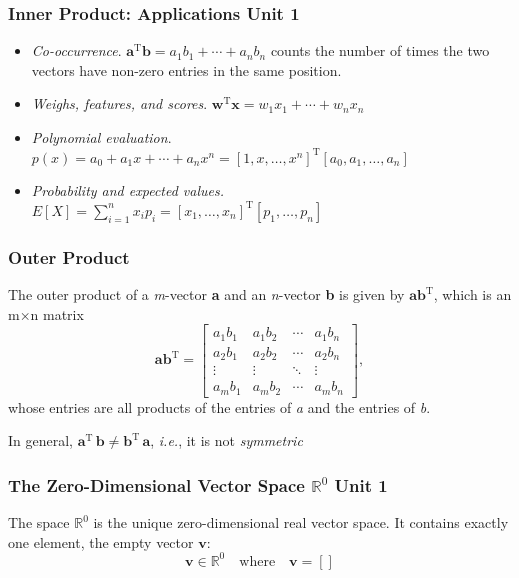 \documentclass[12pt]{beamer}
\newcommand{\FrameTitle}[2]{\frametitle{#1 \hfill \small\textnormal{\textcolor{midgray}{#2}}}}
\newcommand{\vsp}{\vspace*{1em}}
\newcommand{\smallvspace}{\vspace*{0.5em}}
\newcommand{\Vector}[1]{\textbf{#1}}
\begin{document}
\begin{frame}\FrameTitle{Inner Product: Applications}{Unit 1}
    \begin{itemize}
        \item \emph{Co-occurrence}. $\Vector{a}^{\textrm{T}} \Vector{b} = a_1b_1 + \cdots + a_nb_n$ counts the number of times the two vectors have non-zero entries in the same position.
        \smallvspace
        \item \emph{Weighs, features, and scores}. $\Vector{w}^{\textrm{T}} \Vector{x} = w_1x_1 + \cdots + w_nx_n$
        \smallvspace
        \item \emph{Polynomial evaluation}. $p(x) = a_0 + a_1x + \cdots + a_nx^n = [1, x, \ldots, x^n]^{\textrm{T}}[a_0, a_1, \ldots, a_n]$
        \smallvspace
        \item \emph{Probability and expected values.} $E[X] = \sum_{i=1}^{n} x_i p_i = [x_1, \ldots, x_n]^{\textrm{T}}[p_1, \ldots, p_n]$
    \end{itemize}
\end{frame}


\begin{frame}\FrameTitle{Outer Product}{}
    \begin{definition}
        The outer product of a \emph{m}-vector \Vector{a} and an \emph{n}-vector \Vector{b} is
        given by $\Vector{a}\Vector{b}^{\textrm{T}}$, which is an m×n matrix
        \[
            \Vector{a}\Vector{b}^{\textrm{T}} = \begin{bmatrix}
                a_1b_1 & a_1b_2 & \cdots & a_1b_n \\
                a_2b_1 & a_2b_2 & \cdots & a_2b_n \\
                \vdots & \vdots & \ddots & \vdots \\
                a_mb_1 & a_mb_2 & \cdots & a_mb_n
            \end{bmatrix},
        \]
        whose entries are all products of the entries of \emph{a} and the entries of \emph{b}.
    \end{definition}

    \vsp
    In general, $\Vector{a}^{\textrm{T}}\,\Vector{b} \neq \Vector{b}^{\textrm{T}}\,\Vector{a}$, \emph{i.e.},
    it is not \emph{symmetric}\vspace*{3pt}\\
\end{frame}



\begin{frame}\FrameTitle{The Zero-Dimensional Vector Space $\mathbb{R}^0$}{Unit 1}
    \begin{definition}
        The space $\mathbb{R}^0$ is the unique zero-dimensional real vector space.
        It contains exactly one element, the empty vector $\Vector{v}$:
        \[
            \Vector{v} \in \mathbb{R}^0 \quad \text{where} \quad \Vector{v} = [ ]
        \]
    \end{definition}
\end{frame}
\end{document}
